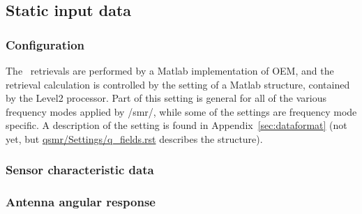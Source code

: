 \clearpage
\newpage


\subsection{Static input data}
\label{sec:static}

\subsubsection{Configuration}

The \smr\ retrievals are performed by a Matlab implementation of OEM,
and the retrieval calculation is controlled by the setting of
a Matlab structure, contained by the Level2 processor.
Part of this setting is general for all of the various 
frequency modes applied by /smr/, while some of the settings
are frequency mode specific.
A description of the setting is found in Appendix~\ref{sec:dataformat}
(not yet, but \url{qsmr/Settings/q_fields.rst} describes the structure).


\clearpage
\newpage

\subsubsection{Sensor characteristic data}

\subsubsection*{Antenna angular response}

